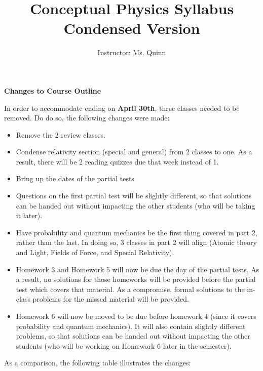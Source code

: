 \documentclass[12pt]{article}
\begin{document}
\title{Conceptual Physics Syllabus \\ Condensed Version}

\author{Instructor: Ms. Quinn} 
	
\maketitle


\noindent \textbf{Changes to Course Outline}

In order to accommodate ending on \textbf{April 30th}, three classes needed to be removed. Do do so, the following changes were made:
\begin{itemize}
	\item Remove the 2 review classes.
	\item Condense relativity section (special and general) from 2 classes to one. As a result, there will be 2 reading quizzes due that week instead of 1.
	\item Bring up the dates of the partial tests
	\item Questions on the first partial test will be slightly different, so that solutions can be handed out without impacting the other students (who will be taking it later).
	\item Have probability and quantum mechanics be the first thing covered in part 2, rather than the last. In doing so, 3 classes in part 2 will align (Atomic theory and Light, Fields of Force, and Special Relativity).
	\item Homework 3 and Homework 5 will now be due the day of the partial tests. As a result, no solutions for those homeworks will be provided before the partial test which covers that material. As a compromise, formal solutions to the in-class problems for the missed material will be provided.
	\item Homework 6 will now be moved to be due before homework 4 (since it covers probability and quantum mechanics). It will also contain slightly different problems, so that solutions can be handed out without impacting the other students (who will be working on Homework 6 later in the semester).
\end{itemize}

\clearpage
\noindent As a comparison, the following table illustrates the changes:
\vspace{0.1in}
\end{document}

